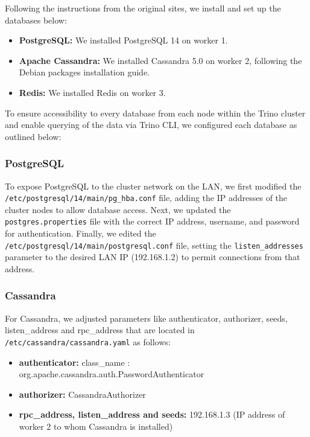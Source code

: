 \documentclass[conference]{IEEEtran}
\begin{document}
Following the instructions from the original sites, we install and set up the databases below:

\begin{itemize}
	\item \textbf{PostgreSQL:} We installed PostgreSQL 14 on worker 1.
	\item \textbf{Apache Cassandra:} We installed Cassandra 5.0 on worker 2, following the Debian packages installation guide.
	\item \textbf{Redis:} We installed Redis on worker 3.
\end{itemize}


To ensure accessibility to every database from each node within the Trino cluster and enable querying of the data via Trino CLI, we configured each database as outlined below:

\subsubsection{PostgreSQL}

To expose PostgreSQL to the cluster network on the LAN, we first modified the \texttt{/etc/postgresql/14/main/pg\_hba.conf} file,
adding the IP addresses of the cluster nodes to allow database access. Next, we updated the \texttt{postgres.properties} file with the
correct IP address, username, and password for authentication. Finally, we edited the \texttt{/etc/postgresql/14/main/postgresql.conf}
file, setting the \texttt{listen\_addresses} parameter to the desired LAN IP (192.168.1.2) to permit connections from that address.
\subsubsection{Cassandra}

For Cassandra, we adjusted parameters like authenticator, authorizer, seeds, listen\_address and rpc\_address that are located in \texttt{/etc/cassandra/cassandra.yaml} as follows:

\begin{itemize}
	\item \textbf{authenticator:} class\_name : \\org.apache.cassandra.auth.PasswordAuthenticator
	\item \textbf{authorizer:} CassandraAuthorizer
	\item \textbf{rpc\_address, listen\_address and seeds:} 192.168.1.3 (IP address of worker 2 to whom Cassandra is installed)
\end{itemize}
\end{document}

